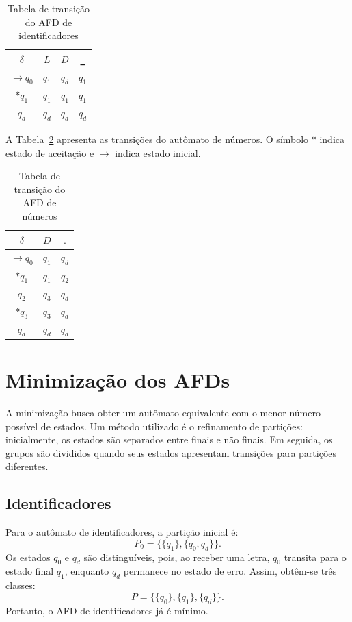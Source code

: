 \documentclass[12pt,a4paper]{article}
\begin{document}
\begin{table}[H]
\centering
\caption{Tabela de transição do AFD de identificadores}
\label{tab:trans-ident}
\begin{tabular}{c|ccc}
\toprule
$\delta$ & $L$ & $D$ & \texttt{\_} \\
\midrule
$\rightarrow q_0$ & $q_1$ & $q_d$ & $q_1$ \\
$*q_1$ & $q_1$ & $q_1$ & $q_1$ \\
$q_d$ & $q_d$ & $q_d$ & $q_d$ \\
\bottomrule
\end{tabular}
\end{table}

A Tabela~\ref{tab:trans-num} apresenta as transições do autômato de números.
O símbolo $*$ indica estado de aceitação e $\rightarrow$ indica estado
inicial.

\begin{table}[H]
\centering
\caption{Tabela de transição do AFD de números}
\label{tab:trans-num}
\begin{tabular}{c|cc}
\toprule
$\delta$ & $D$ & $.$ \\
\midrule
$\rightarrow q_0$ & $q_1$ & $q_d$ \\
$*q_1$ & $q_1$ & $q_2$ \\
$q_2$ & $q_3$ & $q_d$ \\
$*q_3$ & $q_3$ & $q_d$ \\
$q_d$ & $q_d$ & $q_d$ \\
\bottomrule
\end{tabular}
\end{table}

\section{Minimização dos AFDs}

A minimização busca obter um autômato equivalente com o menor número
possível de estados. Um método utilizado é o refinamento de partições:
inicialmente, os estados são separados entre finais e não finais. Em seguida,
os grupos são divididos quando seus estados apresentam transições para
partições diferentes.

\subsection{Identificadores}

Para o autômato de identificadores, a partição inicial é:
\[
    P_0 = \big\{\{q_1\},\{q_0,q_d\}\big\}.
\]
Os estados $q_0$ e $q_d$ são distinguíveis, pois, ao receber uma letra,
$q_0$ transita para o estado final $q_1$, enquanto $q_d$ permanece no estado
de erro. Assim, obtêm-se três classes:
\[
    P = \big\{\{q_0\},\{q_1\},\{q_d\}\big\}.
\]
Portanto, o AFD de identificadores já é mínimo.
\end{document}
